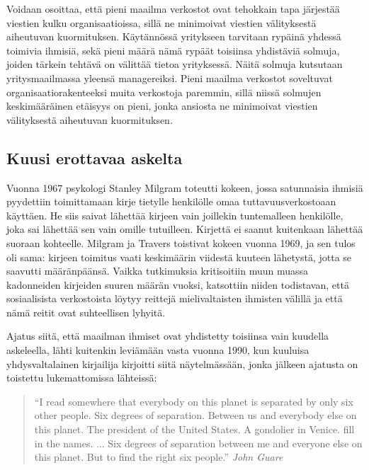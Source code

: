 \documentclass[finnish,12pt,a4paper,pdftex,elec,utf8]{aaltothesis}
\begin{document}
Voidaan osoittaa, että pieni maailma verkostot ovat tehokkain tapa järjestää viestien kulku organisaatioissa, \cite{Six-Degrees} sillä ne minimoivat viestien välityksestä aiheutuvan kuormituksen. Käytännössä yritykseen tarvitaan rypäinä yhdessä toimivia ihmisiä, sekä pieni määrä nämä rypäät toisiinsa yhdistäviä solmuja, joiden tärkein tehtävä on välittää tietoa yrityksessä. Näitä solmuja kutsutaan yritysmaailmassa yleensä managereiksi. Pieni maailma verkostot soveltuvat organisaatiorakenteeksi muita verkostoja paremmin, sillä niissä solmujen keskimääräinen etäisyys on pieni, jonka ansiosta ne minimoivat viestien välityksestä aiheutuvan kuormituksen.

\subsection{Kuusi erottavaa askelta}
\label{subsec:Kuusi erottavaa askelta}

Vuonna 1967 psykologi Stanley Milgram toteutti kokeen, jossa satunnaisia ihmisiä pyydettiin toimittamaan kirje tietylle henkilölle omaa tuttavuusverkostoaan käyttäen. He siis saivat lähettää kirjeen vain joillekin tuntemalleen henkilölle, joka sai lähettää sen vain omille tutuilleen. Kirjettä ei saanut kuitenkaan lähettää suoraan kohteelle. Milgram ja Travers toistivat kokeen vuonna 1969, ja sen tulos oli sama: kirjeen toimitus vaati keskimäärin viidestä kuuteen lähetystä, jotta se saavutti määränpäänsä. Vaikka tutkimuksia kritisoitiin muun muassa kadonneiden kirjeiden suuren määrän vuoksi, katsottiin niiden todistavan, että sosiaalisista verkostoista löytyy reittejä mielivaltaisten ihmisten välillä ja että nämä reitit ovat suhteellisen lyhyitä. \cite[31]{Linkit}

Ajatus siitä, että maailman ihmiset ovat yhdistetty toisiinsa vain kuudella askeleella, lähti kuitenkin leviämään vasta vuonna 1990, kun kuuluisa yhdysvaltalainen kirjailija kirjoitti siitä näytelmässään, jonka jälkeen ajatusta on toistettu lukemattomissa lähteissä:

\begin{quote}
“I read somewhere that everybody on this planet is separated by only six other people. Six degrees of separation. Between us and everybody else on this planet. The president of the United States. A gondolier in Venice. fill in the names. ... Six degrees of separation between me and everyone else on this planet. But to find the right six people.” \textit{John Guare \cite{Guare_runo}}
\end{quote}
\end{document}
